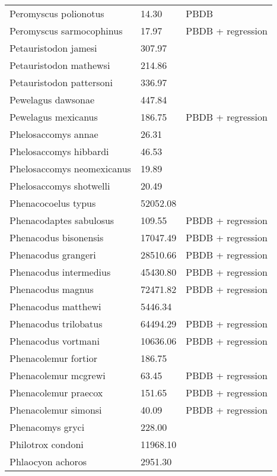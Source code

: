 \documentclass{article}
\begin{document}
\begin{center}
\begin{longtable}{p{} p{} p{}}
    Peromyscus polionotus & 14.30 & PBDB \\ 
    Peromyscus sarmocophinus & 17.97 & PBDB + regression \\ 
    Petauristodon jamesi & 307.97 & \cite{Tomiya2013} \\ 
    Petauristodon mathewsi & 214.86 & \cite{Tomiya2013} \\ 
    Petauristodon pattersoni & 336.97 & \cite{Tomiya2013} \\ 
    Pewelagus dawsonae & 447.84 & \cite{Jepsen1932} \\ 
    Pewelagus mexicanus & 186.75 & PBDB + regression \\ 
    Phelosaccomys annae & 26.31 & \cite{Tomiya2013} \\ 
    Phelosaccomys hibbardi & 46.53 & \cite{Tomiya2013} \\ 
    Phelosaccomys neomexicanus & 19.89 & \cite{Tomiya2013} \\ 
    Phelosaccomys shotwelli & 20.49 & \cite{Tomiya2013} \\ 
    Phenacocoelus typus & 52052.08 & \cite{Tomiya2013} \\ 
    Phenacodaptes sabulosus & 109.55 & PBDB + regression \\ 
    Phenacodus bisonensis & 17047.49 & PBDB + regression \\ 
    Phenacodus grangeri & 28510.66 & PBDB + regression \\ 
    Phenacodus intermedius & 45430.80 & PBDB + regression \\ 
    Phenacodus magnus & 72471.82 & PBDB + regression \\ 
    Phenacodus matthewi & 5446.34 & \cite{Cope1871} \\ 
    Phenacodus trilobatus & 64494.29 & PBDB + regression \\ 
    Phenacodus vortmani & 10636.06 & PBDB + regression \\ 
    Phenacolemur fortior & 186.75 & \cite{Wood1962} \\ 
    Phenacolemur mcgrewi & 63.45 & PBDB + regression \\ 
    Phenacolemur praecox & 151.65 & PBDB + regression \\ 
    Phenacolemur simonsi & 40.09 & PBDB + regression \\ 
    Phenacomys gryci & 228.00 & \cite{McKenna2011} \\ 
    Philotrox condoni & 11968.10 & \cite{Tomiya2013} \\ 
    Phlaocyon achoros & 2951.30 & \cite{Tomiya2013} \\ 

\end{longtable}
\end{center}
\end{document}

